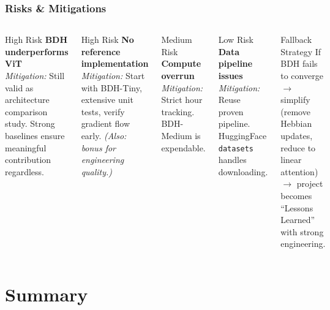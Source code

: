 \documentclass{beamer}
\begin{document}
\begin{frame}
\frametitle{Risks \& Mitigations}

\begin{columns}
\begin{alertblock}{High Risk}
\textbf{BDH underperforms ViT}\\
\footnotesize \textit{Mitigation:} Still valid as architecture comparison study. Strong baselines ensure meaningful contribution regardless.
\end{alertblock}

\vspace{0.3em}
\begin{alertblock}{High Risk}
\textbf{No reference implementation}\\
\footnotesize \textit{Mitigation:} Start with BDH-Tiny, extensive unit tests, verify gradient flow early. \textit{(Also: bonus for engineering quality.)}
\end{alertblock}

\begin{block}{Medium Risk}
\textbf{Compute overrun}\\
\footnotesize \textit{Mitigation:} Strict hour tracking. BDH-Medium is expendable.
\end{block}

\vspace{0.3em}
\begin{block}{Low Risk}
\textbf{Data pipeline issues}\\
\footnotesize \textit{Mitigation:} Reuse proven pipeline. HuggingFace \texttt{datasets} handles downloading.
\end{block}

\vspace{0.3em}
\begin{exampleblock}{Fallback Strategy}
\footnotesize If BDH fails to converge $\rightarrow$ simplify (remove Hebbian updates, reduce to linear attention) $\rightarrow$ project becomes ``Lessons Learned'' with strong engineering.
\end{exampleblock}
\end{columns}

\end{frame}

\section{Summary}
\end{document}
